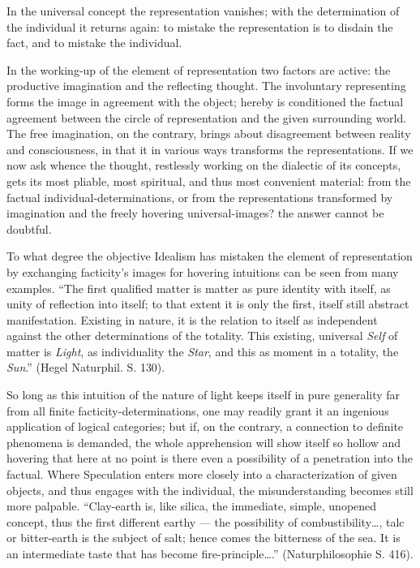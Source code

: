 \documentclass[12pt]{book}
\begin{document}
In the universal concept the representation vanishes; with the determination of
the individual it returns again:
to mistake the representation is to disdain the fact, and to mistake the
individual.

In the working-up of the element of representation two factors are active: the
productive imagination and the reflecting thought. The involuntary representing
forms the image in agreement with the object; hereby is conditioned the factual
agreement between the circle of representation and the given surrounding world.
The free imagination, on the contrary, brings about disagreement between reality
and consciousness, in that it in various ways transforms the representations. If
we now ask whence the thought, restlessly working on the dialectic of its
concepts, gets its most pliable, most spiritual, and thus most convenient
material: from the factual individual-determinations, or from the representations
transformed by imagination and the freely hovering universal-images? the answer
cannot be doubtful.

To what degree the objective Idealism has mistaken the element of representation
by exchanging facticity's images for hovering intuitions can be seen from many
examples. ``The first qualified matter is matter as pure identity with itself, as
unity of reflection into itself; to that extent it is only the first, itself still
abstract manifestation. Existing in nature, it is the relation to itself as
independent against the other determinations of the totality. This existing,
universal \emph{Self} of matter is \emph{Light}, as individuality the
\emph{Star}, and this as moment in a totality, the \emph{Sun}.'' (Hegel Naturphil.
S. 130).

So long as this intuition of the nature of light keeps itself in pure generality
far from all finite facticity-determinations, one may readily grant it an
ingenious application of logical categories; but if, on the contrary, a connection
to definite phenomena is demanded, the whole apprehension will show itself so
hollow and hovering that here at no point is there even a possibility of a
penetration into the factual.
Where Speculation enters more closely into a characterization of given objects, and
thus engages with the individual, the misunderstanding becomes still more
palpable. ``Clay-earth is, like silica, the immediate, simple, unopened concept,
thus the first different earthy — the possibility of combustibility\ldots, talc or
bitter-earth is the subject of salt; hence comes the bitterness of the sea. It is
an intermediate taste that has become fire-principle\ldots.'' (Naturphilosophie S.
416).
\end{document}
